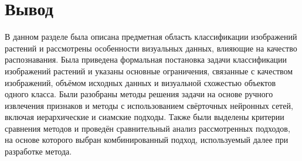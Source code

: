 \section{Вывод}

В данном разделе была описана предметная область классификации изображений растений и рассмотрены особенности визуальных данных, влияющие на качество распознавания. Была приведена формальная постановка задачи классификации изображений растений и указаны основные ограничения, связанные с качеством изображений, объёмом исходных данных и визуальной схожестью объектов одного класса. Были разобраны методы решения задачи на основе ручного извлечения признаков и методы с использованием свёрточных нейронных сетей, включая иерархические и сиамские подходы. Также были выделены критерии сравнения методов и проведён сравнительный анализ рассмотренных подходов, на основе которого выбран комбинированный подход, используемый далее при разработке метода.
